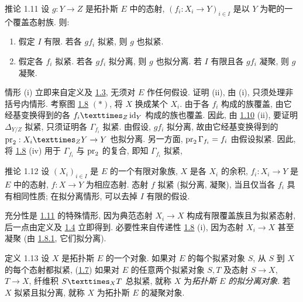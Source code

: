 \begin{enonce*}{推论 1.11}
设 $g:Y\to Z$ 是拓扑斯 $E$ 中的态射,
$(f_i:X_i\to Y)_{i\in I}$ 是以 $Y$ 为靶的一个覆盖态射族.
则:
\begin{enumerate}
\renewcommand{\theenumi}{\roman{enumi}}
\renewcommand{\labelenumi}{(\theenumi)}
\item 假定 $I$ 有限. 若各 $gf_i$ 拟紧, 则 $g$ 也拟紧.

\item 假定各 $f_i$ 拟紧.
若各 $gf_i$ 拟分离, 则 $g$ 也拟分离.
若 $I$ 有限且各 $gf_i$ 凝聚, 则 $g$ 凝聚.
\end{enumerate}
\end{enonce*}

情形 (i) 立即来自定义及 \hyperref[VI.prop1.3]{1.3},
无须对 $E$ 作任何假设.
证明 (ii), 由 (i), 只须处理非括号内情形.
考察图 \hyperref[VI.prop1.8]{1.8} $(\ast)$,
将 $X$ 换成某个 $X_i$.
由于各 $f_i$ 构成的族覆盖,
由它经基变换得到的各 $\fprod{f_i}{\id_Y}{Z}$ 构成的族也覆盖.
因此\pageoriginale{}, 由 \hyperref[VI.prop1.10]{1.10} (ii),
要证明 $\Delta_{Y/Z}$ 拟紧, 只须证明各 $\Gamma_{f_i}$ 拟紧.
由假设, $gf_i$ 拟分离,
故由它经基变换得到的 $\pr_2:\fprod{X_i}{Y}{Z}\to Y$ 也拟分离.
另一方面, $\operatorname{pr}_2\Gamma_{f_i}=f_i$ 由假设拟紧.
因此, 将 \hyperref[VI.prop1.8]{1.8} (iv)
用于 $\Gamma_{f_i}$ 与 $\operatorname{pr}_2$ 的复合, 即知 $\Gamma_{f_i}$ 拟紧, \cqfd

\begin{enonce*}{推论 1.12}
设 $(X_i)_{i\in I}$ 是 $E$ 的一个有限对象族,
$X$ 是各 $X_i$ 的余积,
$f_i:X_i\to Y$ 是 $E$ 中的态射,
$f:X\to Y$ 为相应态射.
态射 $f$ 拟紧 (\resp 拟分离, \resp 凝聚),
当且仅当各 $f_i$ 具有相同性质;
在拟分离情形, 可以去掉 $I$ 有限的假设.
\end{enonce*}

充分性是 \hyperref[VI.cor1.11]{1.11} 的特殊情形,
因为典范态射 $X_i\to X$ 构成有限覆盖族且为拟紧态射,
后一点由定义及 \hyperref[VI.cor1.4]{1.4} 立即得到.
必要性来自传递性 \hyperref[VI.prop1.8]{1.8} (i),
因为态射 $X_i\to X$ 甚至凝聚
(由 \hyperref[VI.cor1.8.1]{1.8.1}, 它们拟分离).

\begin{enonce*}{定义 1.13}
设 $X$ 是拓扑斯 $E$ 的一个对象.
如果对 $E$ 的每个拟紧对象 $S$,
从 $S$ 到 $X$ 的每个态射都拟紧,
\ie (\hyperref[VI.def1.7]{1.7})
如果对 $E$ 的任意两个拟紧对象 $S,T$
及态射 $S\to X$, $T\to X$,
纤维积 $\fprod{S}{T}{X}$ 总拟紧,
就称 $X$ 为\emph{拓扑斯 $E$ 的拟分离对象}.
若 $X$ 拟紧且拟分离, 就称 $X$ 为拓扑斯 $E$ 的凝聚对象.
\end{enonce*}

